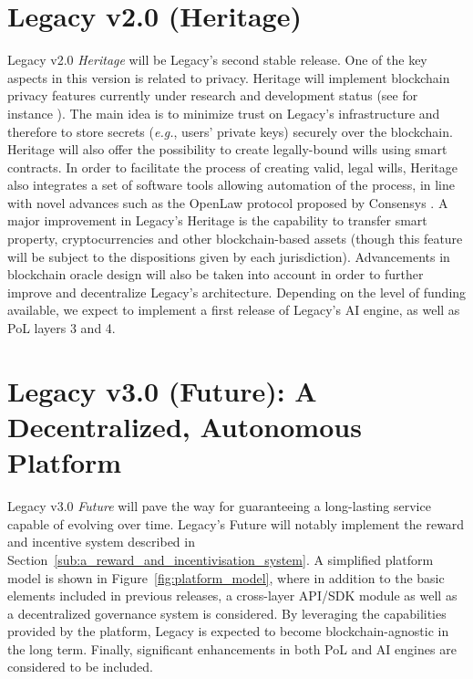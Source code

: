 
\section{Legacy v2.0 (Heritage)} %
\label{sec:legacy_v2_0_heritage}
Legacy v2.0 \textit{Heritage} will be Legacy’s second stable release. 
One of the key aspects in this version is related to privacy. 
Heritage will implement blockchain privacy features currently under research and development status (see for instance \cite{keep}). The main idea is to minimize trust on Legacy's infrastructure and therefore to store secrets (\textit{e.g.}, users' private keys) securely over the blockchain.
Heritage will also offer the possibility to create legally-bound wills using smart contracts.
In order to facilitate the process of creating valid, legal wills, Heritage also integrates a set of software tools allowing automation of the process, in line with novel advances such as the OpenLaw protocol proposed by Consensys \cite{OpenLaw}.
A major improvement in Legacy's Heritage is the capability to transfer smart property, cryptocurrencies and other blockchain-based assets (though this feature will be subject to the dispositions given by each jurisdiction).
Advancements in blockchain oracle design will also be taken into account in order to further improve and decentralize Legacy's architecture.
Depending on the level of funding available, we expect to implement a first release of Legacy's AI engine, as well as PoL layers 3 and 4.

\section{Legacy v3.0 (Future): A Decentralized, Autonomous Platform} %
\label{sec:lgacy_v3_0}
Legacy v3.0 \textit{Future} will pave the way for guaranteeing a long-lasting service capable of evolving over time. Legacy's Future will notably implement the reward and incentive system described in Section~\ref{sub:a_reward_and_incentivisation_system}.
A simplified platform model is shown in Figure~\ref{fig:platform_model}, where in addition to the basic elements included in previous releases, a cross-layer API/SDK module as well as a decentralized governance system is considered.
By leveraging the capabilities provided by the platform, Legacy is expected to become blockchain-agnostic in the long term.
Finally, significant enhancements in both PoL and AI engines are considered to be included.

